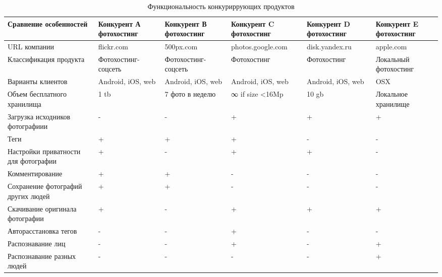\begin{table}[H]
  \caption{Функциональность конкуриррующих продуктов}\label{comp-table}
  \begin{spacing}{1}
  \small
  \begin{tabular}{|p{3cm}|p{2.5cm}|p{2.5cm}|p{2.5cm}|p{2.5cm}|p{2cm}|}
  \hline Сравнение особенностей & Конкурент А фотохостинг & Конкурент В фотохостинг & Конкурент C фотохостинг & Конкурент D фотохостинг & Конкурент E фотохостинг \\ 
  \hline URL компании & flickr.com & 500px.com & photos.google.com & disk.yandex.ru & apple.com \\ 
  \hline Классификация продукта & Фотохостинг-соцсеть & Фотохостинг-соцсеть & Фотохостинг & Фотохостинг & Локальный фотохостинг \\ 
  \hline Варианты клиентов & Android, iOS, web & Android, iOS, web & Android, iOS, web & Android, iOS, web & OSX \\ 
  \hline Объем бесплатного хранилища & 1 tb & 7 фото в неделю & ∞ if size <16Mp & 10 gb & Локальное хранилище \\ 
  \hline Загрузка исходников фотографиии & - & - & + & + & + \\ 
  \hline Теги & + & + & + & - & - \\ 
  \hline Настройки приватности для фотографии & + & - & + & + & - \\ 
  \hline Комментирование & + & + & - & - & - \\ 
  \hline Сохранение фотографий других людей & + & + & - & - & - \\ 
  \hline Скачивание оригинала фотографии & + & - & + & + & + \\ 
  \hline Авторасстановка тегов & - & - & + & - & - \\ 
  \hline Распознавание лиц & - & - & + & - & + \\ 
  \hline Распознавание разных людей & - & - & - & - & + \\ 

\end{tabular}
\end{spacing}
\end{table}

